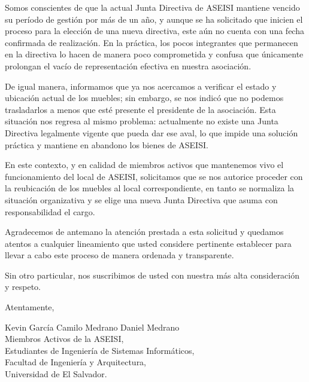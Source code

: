 \documentclass[12pt, a4paper]{letter} %
\begin{document}
Somos conscientes de que la actual Junta Directiva de ASEISI mantiene vencido su período de gestión por más de un año, y aunque se ha solicitado que inicien el proceso para la elección de una nueva directiva, este aún no cuenta con una fecha confirmada de realización. En la práctica, los pocos integrantes que permanecen en la directiva lo hacen de manera poco comprometida y confusa que únicamente prolongan el vacío de representación efectiva en nuestra asociación.

De igual manera, informamos que ya nos acercamos a verificar el estado y ubicación actual de los muebles; sin embargo, se nos indicó que no podemos trasladarlos a menos que esté presente el presidente de la asociación. Esta situación nos regresa al mismo problema: actualmente no existe una Junta Directiva legalmente vigente que pueda dar ese aval, lo que impide una solución práctica y mantiene en abandono los bienes de ASEISI.

En este contexto, y en calidad de miembros activos que mantenemos vivo el funcionamiento del local de ASEISI, solicitamos que se nos autorice proceder con la reubicación de los muebles al local correspondiente, en tanto se normaliza la situación organizativa y se elige una nueva Junta Directiva que asuma con responsabilidad el cargo.

Agradecemos de antemano la atención prestada a esta solicitud y quedamos atentos a cualquier lineamiento que usted considere pertinente establecer para llevar a cabo este proceso de manera ordenada y transparente.

Sin otro particular, nos suscribimos de usted con nuestra más alta consideración y respeto.



Atentamente,

\vspace{1.3cm}

Kevin García \hfill Camilo Medrano \hfill Daniel Medrano\\
Miembros Activos de la ASEISI,\\
Estudiantes de Ingeniería de Sistemas Informáticos,\\
Facultad de Ingeniería y Arquitectura,\\
Universidad de El Salvador.
\end{document}

